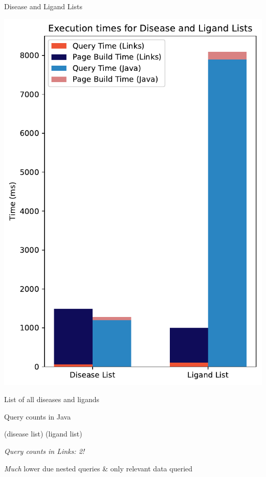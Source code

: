 \documentclass[11.5pt, aspectratio=169]{beamer}
\begin{document}
\begin{frame}{Disease and Ligand Lists}

  \begin{minipage}{0.375\textwidth}
  \centering
  \includegraphics[height=0.8\textheight]{images/diseaselist_stacked.pdf}
  \end{minipage}
\hfill
  \begin{minipage}{0.6\textwidth}
  \begin{fullpageitemize}
  \item {\large List of all diseases and ligands}
    \vspace{1em}
  \item {\large Query counts in Java}
    \begin{itemize}
       (disease list)
       (ligand list)
    \end{itemize}
    \vspace{1em}
  \item {\large \emph{Query counts in Links: 2!}}
    \begin{itemize}
      \itemR \emph{Much} lower due nested queries \& only relevant data queried
    \end{itemize}
  \end{fullpageitemize}
  \end{minipage}

\end{frame}
\end{document}
